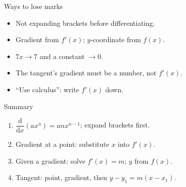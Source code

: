 \documentclass[aspectratio=169,11pt,t,xcolor=table]{beamer}
\begin{document}
\begin{frame}{Ways to lose marks}\relax
\begin{itemize}
\item[\lmnum{expand}] Not expanding brackets before differentiating.
\item[\lmnum{wrongfn}] Gradient from $f'(x)$; $y$-coordinate from $f(x)$.
\item[\lmnum{terms}] $7x\to7$ and a constant $\to0$.
\item[\lmnum{xinm}] The tangent's gradient must be a number, not $f'(x)$.
\item[\lmnum{nocalc}] ``Use calculus'': write $f'(x)$ down.
\end{itemize}
\end{frame}

\begin{frame}{Summary}\relax
{\sSum
\begin{enumerate}
\item $\dfrac{\mathrm{d}}{\mathrm{d}x}(ax^{n})=anx^{n-1}$; expand brackets first.
\item Gradient at a point: substitute $x$ into $f'(x)$.
\item Given a gradient: solve $f'(x)=m$; $y$ from $f(x)$.
\item Tangent: point, gradient, then $y-y_{1}=m(x-x_{1})$.
\end{enumerate}}
\end{frame}
\end{document}
